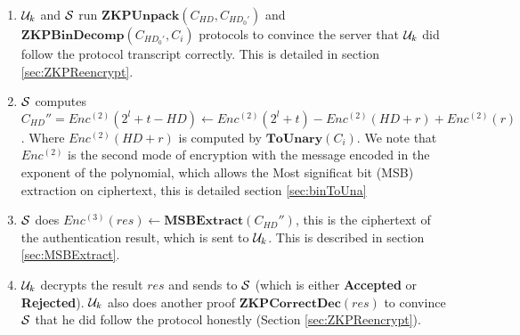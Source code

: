 \begin{description}
\begin{enumerate}
		\item $\mathcal{U}_k$ and $\mathcal{S}$ run $\mathbf{ZKPUnpack}(C_{HD},C_{HD_0'})$ and
		$\mathbf{ZKPBinDecomp}(C_{HD_0'},C_i)$
		protocols to convince the server that
		$\mathcal{U}_k$ did follow the protocol transcript correctly. This is detailed
		in section
		\ref{sec:ZKPReencrypt}.
		\label{protocol:step6}
		\item $\mathcal{S}$ computes $C_{HD}'' = Enc^{(2)}(2^l + t - HD) \gets
		Enc^{(2)}(2^l + t) - Enc^{(2)}(HD+r) + Enc^{(2)}(r)$. Where
		$Enc^{(2)}(HD + r)$ is computed by $\mathbf{ToUnary}(C_i)$. We note that
		$Enc^{(2)}$ is the second mode of encryption with the message
		encoded in the exponent of the polynomial, which allows the
		Most significat bit (MSB)
		extraction on ciphertext, this is detailed section \ref{sec:binToUna} \label{protocol:step7}
		\item $\mathcal{S}$ does $Enc^{(3)}(res) \gets
		\mathbf{MSBExtract}(C_{HD}'')$, this is the ciphertext
		of the authentication result, which is sent to $\mathcal{U}_k$. This
		is described in section \ref{sec:MSBExtract}.
		\label{protocol:step8}
		\item $\mathcal{U}_k$ decrypts the result $res$ and sends to $\mathcal{S}$
		(which is either \textbf{Accepted} or \textbf{Rejected}).
		$\mathcal{U}_k$ also does another proof $\mathbf{ZKPCorrectDec}(res)$
		to convince $\mathcal{S}$ that he
		did follow the protocol honestly (Section \ref{sec:ZKPReencrypt}).\label{protocol:step9}








\end{enumerate}
\end{description}
